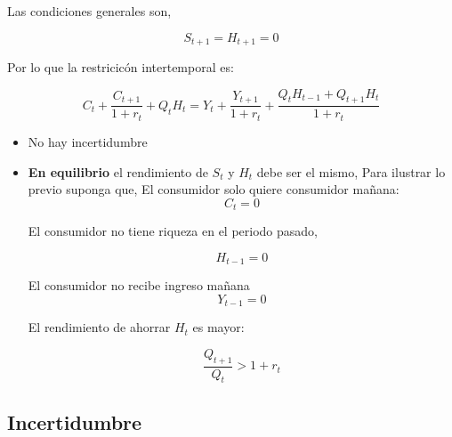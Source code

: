 Las condiciones generales son, 

$$S_{t+1}=H_{t+1}=0$$

Por lo que la restricicón intertemporal es: 

\begin{equation}
    C_{t}+\frac{C_{t+1}}{1+r_{t}} +Q_{t}H_{t} = Y_{t}+\frac{Y_{t+1}}{1+r_{t}}  + \frac{Q_{t}H_{t-1}+Q_{t+1}H_{t}}{1+r_{t}}
\end{equation}

\begin{itemize}
    \item No hay incertidumbre
    \item \textbf{En equilibrio} el rendimiento de $S_{t}$ y $H_{t}$ debe ser el mismo, Para ilustrar lo previo suponga que, El consumidor solo quiere consumidor mañana:
    $$C_{t}=0$$
    
    El consumidor no tiene riqueza en el periodo pasado,
    
    $$H_{t-1}=0$$
    
    El consumidor no recibe ingreso mañana
    $$Y_{t-1}=0$$
    
    El rendimiento de ahorrar $H_{t}$ es mayor:
    
    $$\frac{Q_{t+1}}{Q_{t}} > 1+r_{t}$$
\end{itemize}

\subsection{Incertidumbre}
